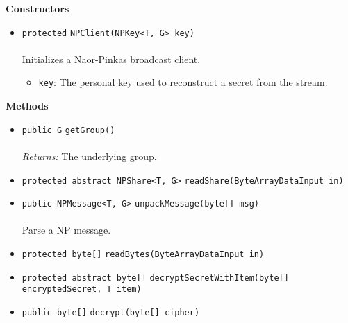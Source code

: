 \textbf{\sffamily Constructors}
\begin{itemize}
\item \lstinline|protected| \lstinline|NPClient|\lstinline|(NPKey<T, G> key)|\\ \\[-0.6em]
Initializes a Naor-Pinkas broadcast client.
\begin{itemize}
\item \lstinline|key|: The personal key used to reconstruct a secret from the stream.
\end{itemize}



\end{itemize}


\textbf{\sffamily Methods}
\begin{itemize}
\item \lstinline|public G| \lstinline|getGroup|\lstinline|()|\\ \\[-0.6em]
\emph{Returns:} The underlying group.



\item \lstinline|protected abstract NPShare<T, G>| \lstinline|readShare|\lstinline|(ByteArrayDataInput in)| \\[-0.6em]




\item \lstinline|public NPMessage<T, G>| \lstinline|unpackMessage|\lstinline|(byte[] msg)|\\ \\[-0.6em]
Parse a NP message.



\item \lstinline|protected byte[]| \lstinline|readBytes|\lstinline|(ByteArrayDataInput in)| \\[-0.6em]




\item \lstinline|protected abstract byte[]| \lstinline|decryptSecretWithItem|\lstinline|(byte[] encryptedSecret, T item)| \\[-0.6em]




\item \lstinline|public byte[]| \lstinline|decrypt|\lstinline|(byte[] cipher)| \\[-0.6em]




\end{itemize}

